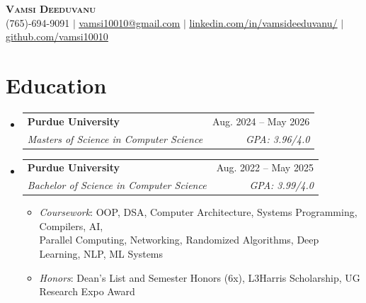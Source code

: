 \documentclass[letterpaper,11pt]{article}
\makeatletter
\newcommand{\resumeItem}[1]{
  \item\small{
    {#1 \vspace{-2pt}}
  }
}
\newcommand{\resumeSubheading}[4]{
  \vspace{-2pt}\item
    \begin{tabular*}{0.97\textwidth}[t]{l@{\extracolsep{\fill}}r}
      \textbf{\small#1} & \small#2 \\
      \textit{\small#3} & \textit{\small #4} \\
    \end{tabular*}\vspace{-7pt}
}
\newcommand{\resumeSubHeadingListStart}{\begin{itemize}[leftmargin=0.15in, label={}]}
\newcommand{\resumeSubHeadingListEnd}{\end{itemize}}
\newcommand{\resumeItemListStart}{\begin{itemize}}
\newcommand{\resumeItemListEnd}{\end{itemize}\vspace{-6pt}}
\makeatother
\begin{document}
\begin{center}
    \textbf{\Huge \scshape Vamsi Deeduvanu} \\ \vspace{1pt}
    \small (765)-694-9091 $|$ \href{mailto:vamsi10010@gmail.com}{\underline{vamsi10010@gmail.com}} $|$ 
    \href{https://www.linkedin.com/in/vamsideeduvanu}{\underline{linkedin.com/in/vamsideeduvanu/}} $|$
    \href{https://github.com/vamsi10010}{\underline{github.com/vamsi10010}}
\end{center}


\vspace{-14pt}
\section{Education}
  \resumeSubHeadingListStart
    \resumeSubheading
      {Purdue University}{Aug. 2024 -- May 2026}
      {Masters of Science in Computer Science}{\textit{GPA}: 3.96/4.0}
    \resumeSubheading
      {Purdue University}{Aug. 2022 -- May 2025}
      {Bachelor of Science in Computer Science}{\textit{GPA}: 3.99/4.0}
      \resumeItemListStart
        \resumeItem{\textit{Coursework}: OOP, DSA, Computer Architecture, Systems Programming, Compilers, AI, \\Parallel Computing, Networking, Randomized Algorithms, Deep Learning, NLP, ML Systems
        }
        \resumeItem{\textit{Honors}: Dean's List and Semester Honors (6x), L3Harris Scholarship, UG Research Expo Award}
      \resumeItemListEnd
  \resumeSubHeadingListEnd


\end{document}
